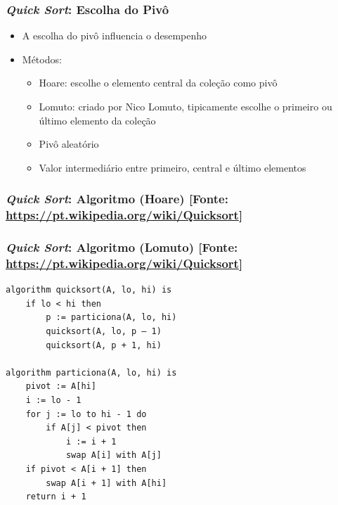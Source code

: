 \documentclass[aspectratio=169]{beamer}
\begin{document}
\begin{frame}[fragile]\frametitle{\emph{Quick Sort}: Escolha do Pivô}
\begin{itemize}
	\item A escolha do pivô influencia o desempenho
	\item Métodos:
	\begin{itemize}
		\item Hoare: escolhe o elemento central da coleção como pivô
		\item Lomuto: criado por Nico Lomuto, tipicamente escolhe o primeiro ou último elemento da coleção
		\item Pivô aleatório
		\item Valor intermediário entre primeiro, central e último elementos
	\end{itemize}
\end{itemize}
\end{frame}

\begin{frame}[fragile]\frametitle{\emph{Quick Sort}: Algoritmo (Hoare) \tiny{[Fonte: \url{https://pt.wikipedia.org/wiki/Quicksort}]}}
\fontsize{1}{6.5}\selectfont{
\begin{verbatim}
procedimento QuickSort(X[], IniVet, FimVet)
var
   i, j, pivo, aux
início
   i <- IniVet
   j <- FimVet
   pivo <- X[(IniVet + FimVet) div 2]
   enquanto(i <= j)
    |      enquanto (X[i] < pivo) faça
    |       |   i <- i + 1
    |      fimEnquanto
    |      enquanto (X[j] > pivo) faça
    |       |   j <- j - 1
    |      fimEnquanto
    |      se (i <= j) então
    |       |   aux  <- X[i]
    |       |   X[i] <- X[j]
    |       |   X[j] <- aux
    |       |   i <- i + 1
    |       |   j <- j - 1
    |      fimSe
   fimEnquanto
   se (IniVet < j) então
    |  QuickSort(X, IniVet, j)
   fimSe
   se (i < FimVet) então
    |  QuickSort(X, i, FimVet)
   fimSe
fimProcedimento
\end{verbatim}
}
\end{frame}

\begin{frame}[fragile]\frametitle{\emph{Quick Sort}: Algoritmo (Lomuto) \tiny{[Fonte: \url{https://pt.wikipedia.org/wiki/Quicksort}]}}
\scriptsize{
\begin{verbatim}
algorithm quicksort(A, lo, hi) is
    if lo < hi then
        p := particiona(A, lo, hi)
        quicksort(A, lo, p – 1)
        quicksort(A, p + 1, hi)

algorithm particiona(A, lo, hi) is
    pivot := A[hi]
    i := lo - 1    
    for j := lo to hi - 1 do
        if A[j] < pivot then
            i := i + 1
            swap A[i] with A[j]
    if pivot < A[i + 1] then
        swap A[i + 1] with A[hi]
    return i + 1
\end{verbatim}
}
\end{frame}
\end{document}
